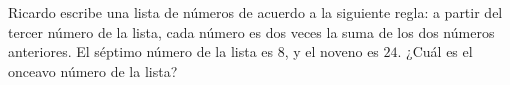 Ricardo escribe una lista de números de acuerdo a la siguiente regla: a partir del tercer número de la lista, cada número es dos veces la suma de los dos números anteriores. El séptimo número de la lista es $8$, y el noveno es $24$. ¿Cuál es el onceavo número de la lista?